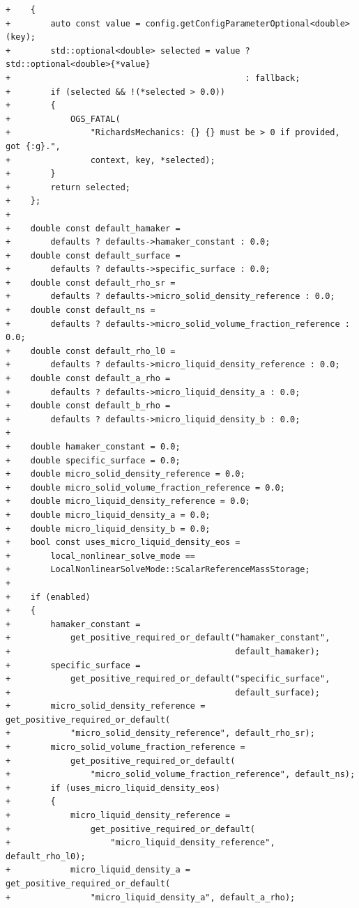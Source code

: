 \documentclass[10pt]{article}
\begin{document}
\begin{lstlisting}
+    {
+        auto const value = config.getConfigParameterOptional<double>(key);
+        std::optional<double> selected = value ? std::optional<double>{*value}
+                                               : fallback;
+        if (selected && !(*selected > 0.0))
+        {
+            OGS_FATAL(
+                "RichardsMechanics: {} {} must be > 0 if provided, got {:g}.",
+                context, key, *selected);
+        }
+        return selected;
+    };
+
+    double const default_hamaker =
+        defaults ? defaults->hamaker_constant : 0.0;
+    double const default_surface =
+        defaults ? defaults->specific_surface : 0.0;
+    double const default_rho_sr =
+        defaults ? defaults->micro_solid_density_reference : 0.0;
+    double const default_ns =
+        defaults ? defaults->micro_solid_volume_fraction_reference : 0.0;
+    double const default_rho_l0 =
+        defaults ? defaults->micro_liquid_density_reference : 0.0;
+    double const default_a_rho =
+        defaults ? defaults->micro_liquid_density_a : 0.0;
+    double const default_b_rho =
+        defaults ? defaults->micro_liquid_density_b : 0.0;
+
+    double hamaker_constant = 0.0;
+    double specific_surface = 0.0;
+    double micro_solid_density_reference = 0.0;
+    double micro_solid_volume_fraction_reference = 0.0;
+    double micro_liquid_density_reference = 0.0;
+    double micro_liquid_density_a = 0.0;
+    double micro_liquid_density_b = 0.0;
+    bool const uses_micro_liquid_density_eos =
+        local_nonlinear_solve_mode ==
+        LocalNonlinearSolveMode::ScalarReferenceMassStorage;
+
+    if (enabled)
+    {
+        hamaker_constant =
+            get_positive_required_or_default("hamaker_constant",
+                                             default_hamaker);
+        specific_surface =
+            get_positive_required_or_default("specific_surface",
+                                             default_surface);
+        micro_solid_density_reference = get_positive_required_or_default(
+            "micro_solid_density_reference", default_rho_sr);
+        micro_solid_volume_fraction_reference =
+            get_positive_required_or_default(
+                "micro_solid_volume_fraction_reference", default_ns);
+        if (uses_micro_liquid_density_eos)
+        {
+            micro_liquid_density_reference =
+                get_positive_required_or_default(
+                    "micro_liquid_density_reference", default_rho_l0);
+            micro_liquid_density_a = get_positive_required_or_default(
+                "micro_liquid_density_a", default_a_rho);

\end{lstlisting}
\end{document}
